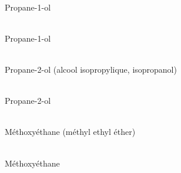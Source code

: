 \documentclass{article}
\begin{document}
\vfill
\begin{center}
\\
Propane-1-ol
\end{center}
\vfill

\vfill
\begin{center}
\\
Propane-1-ol
\end{center}
\vfill

\begin{center}
\\
Propane-2-ol (alcool isopropylique, isopropanol)
\end{center}
\vfill

\begin{center}
\\
Propane-2-ol
\end{center}
\vfill

\begin{center}
\\
Méthoxyéthane (méthyl ethyl éther)
\end{center}
\vfill

\vfill
\begin{center}
\\
Méthoxyéthane
\end{center}
\vfill
\end{document}
